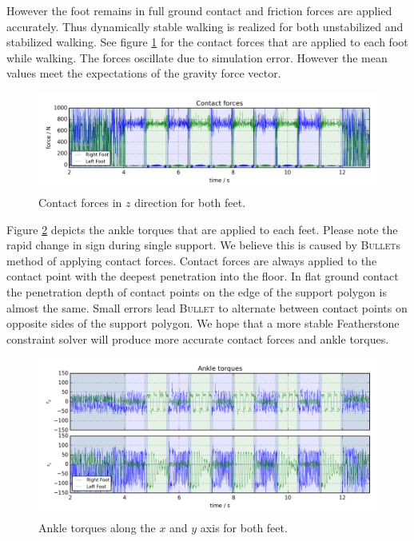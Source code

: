 \documentclass[english,ngerman]{KITreprt}
\newcommand{\name}[1]{\textsc{#1}}
\begin{document}
However the foot remains in full ground contact and friction forces are
applied accurately. Thus dynamically stable walking is realized for both
unstabilized and stabilized walking. See figure \ref{img:contact_forces}
for the contact forces that are applied to each foot while walking. The
forces oscillate due to simulation error. However the mean values meet
the expectations of the gravity force vector.

\begin{figure}[hbt]
\vspace*{-1em}
\includegraphics[width=\textwidth,resolution=300]{images/contact_forces.png}
\caption{Contact forces in $z$ direction for both feet.}
\label{img:contact_forces}
\end{figure}

Figure \ref{img:ankle-torques} depicts the ankle torques that are
applied to each feet. Please note the rapid change in sign during single
support. We believe this is caused by \name{Bullet}s method of applying
contact forces. Contact forces are always applied to the contact point
with the deepest penetration into the floor. In flat ground contact the
penetration depth of contact points on the edge of the support polygon
is almost the same. Small errors lead \name{Bullet} to alternate between
contact points on opposite sides of the support polygon. We hope that a
more stable Featherstone constraint solver will produce more accurate
contact forces and ankle torques.

\begin{figure}[H]
\vspace*{-1em}
\includegraphics[width=\textwidth,resolution=300]{images/ankle_torques.png}
\caption{Ankle torques along the $x$ and $y$ axis for both feet.}
\label{img:ankle-torques}
\end{figure}
\end{document}
